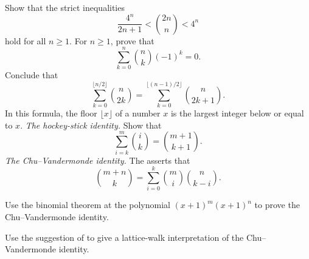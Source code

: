 \begin{routine}
  \exercise \label{exercise:estimates-central-binomial-coefficients}Show that the strict inequalities
  \begin{equation*}
    \frac{4^n}{2n+1} < \binom{2n}{n} < 4^n
  \end{equation*}
  hold for all $n\geq 1$.
  \exercise For $n\geq 1$, prove that
  \begin{equation*}
    \sum_{k=0}^n\binom{n}{k}(-1)^k = 0.
  \end{equation*}
  Conclude that
  \begin{equation*}
    \sum_{k=0}^{\lfloor n/2\rfloor}\binom{n}{2k} =\sum_{k=0}^{\lfloor (n-1)/2\rfloor}\binom{n}{2k+1}.
  \end{equation*}
  In this formula, the floor $\lfloor x\rfloor$ of a number $x$ is the largest integer below or equal to $x$.
  \exercise \label{exercise:hockey-stick-identity}\emph{The hockey-stick identity.} Show that
  \begin{equation*}
    \sum_{i=k}^m\binom{i}{k}=\binom{m+1}{k+1}.
  \end{equation*}
  \exercise \emph{The Chu--Vandermonde identity.}
  The  asserts that
  \begin{equation*}
    \binom{m+n}{k} = \sum_{i=0}^k \binom{m}{i}\binom{n}{k-i}.
  \end{equation*}
  \begin{subexenum}
  \item Use the binomial theorem at the polynomial $(x+1)^m(x+1)^n$ to prove the Chu--Vandermonde identity.
  \item Use the suggestion of  to give a lattice-walk interpretation of the Chu--Vandermonde identity.
  \end{subexenum}
  \begin{figure}[t]
    \centering
\end{figure}
\end{routine}
